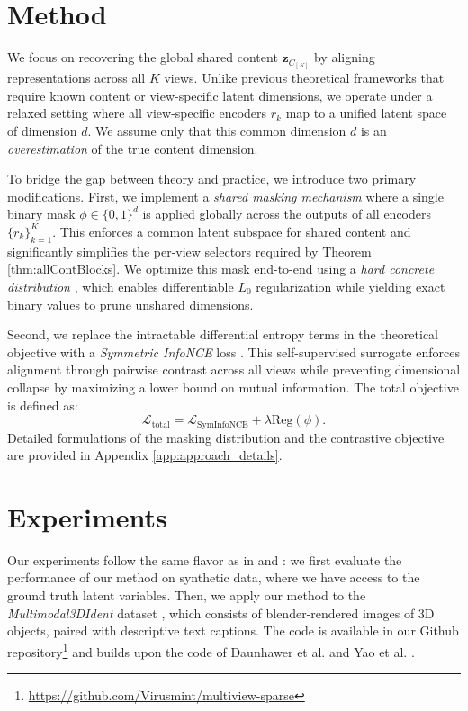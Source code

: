 \documentclass[a4paper,12pt]{article}
\begin{document}
\section{Method}
\label{sec:method}
We focus on recovering the global shared content $\mathbf{z}_{C_{[K]}}$ by aligning representations across all $K$ views. Unlike previous theoretical frameworks that require known content or view-specific latent dimensions, we operate under a relaxed setting where all view-specific encoders $r_k$ map to a unified latent space of dimension $d$. We assume only that this common dimension $d$ is an \textit{overestimation} of the true content dimension.

To bridge the gap between theory and practice, we introduce two primary modifications. First, we implement a \textit{shared masking mechanism} where a single binary mask $\phi \in \{0, 1\}^d$ is applied globally across the outputs of all encoders $\{r_k\}_{k=1}^K$. This enforces a common latent subspace for shared content and significantly simplifies the per-view selectors required by Theorem \ref{thm:allContBlocks}. We optimize this mask end-to-end using a \textit{hard concrete distribution} \cite{louizos2018learningsparseneuralnetworks}, which enables differentiable $L_0$ regularization while yielding exact binary values to prune unshared dimensions.

Second, we replace the intractable differential entropy terms in the theoretical objective with a \textit{Symmetric InfoNCE} loss \cite{oord2019representationlearningcontrastivepredictive, radford2021learning}. This self-supervised surrogate enforces alignment through pairwise contrast across all views while preventing dimensional collapse by maximizing a lower bound on mutual information. The total objective is defined as:
\begin{equation}
  \mathcal{L}_{\text{total}} = \mathcal{L}_{\text{SymInfoNCE}} + \lambda \text{Reg}(\phi).
\end{equation}
Detailed formulations of the masking distribution and the contrastive objective are provided in Appendix \ref{app:approach_details}.

\section{Experiments}

Our experiments follow the same flavor as in \cite{daunhawer2023identifiabilityresultsmultimodalcontrastive} and \cite{yao2024multiviewcausalrepresentationlearning}: we first evaluate the performance of our method on synthetic data, where we have access to the ground truth latent variables. Then, we apply our method to the \textit{Multimodal3DIdent} dataset \cite{daunhawer2023identifiabilityresultsmultimodalcontrastive}, which consists of blender-rendered images of 3D objects, paired with descriptive text captions.
The code is available in our Github repository\footnote{\url{https://github.com/Virusmint/multiview-sparse}} and builds upon the code of Daunhawer et al. \cite{daunhawer2023identifiabilityresultsmultimodalcontrastive} and Yao et al. \cite{yao2024multiviewcausalrepresentationlearning}.
\end{document}
